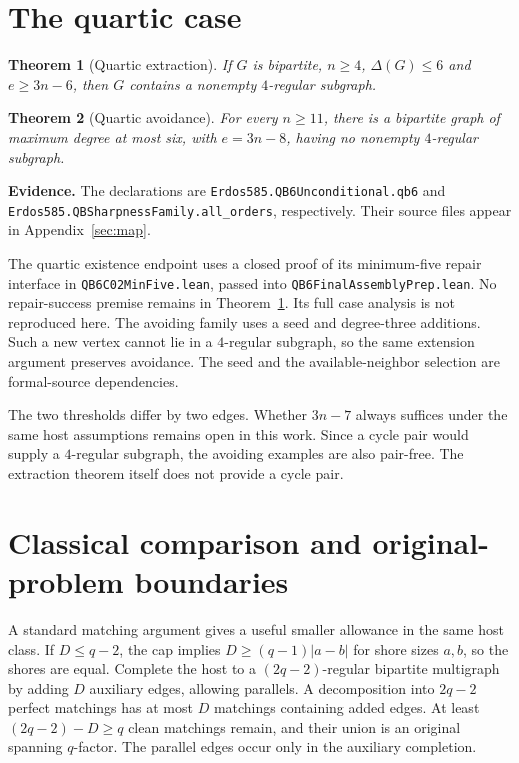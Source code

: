 \documentclass[11pt]{article}
\newtheorem{theorem}{Theorem}
\newcommand{\status}[1]{\par\noindent\textcolor{blue!45!black}{\textbf{Evidence.} #1}\par}
\begin{document}
\section{The quartic case}
\begin{theorem}[Quartic extraction]\label{thm:quartic}
If $G$ is bipartite, $n\ge4$, $\Delta(G)\le6$ and $e\ge3n-6$, then $G$ contains a nonempty $4$-regular subgraph.
\end{theorem}
\begin{theorem}[Quartic avoidance]\label{thm:quarticavoid}
For every $n\ge11$, there is a bipartite graph of maximum degree at most six, with $e=3n-8$, having no nonempty $4$-regular subgraph.
\end{theorem}
\status{The declarations are \nolinkurl{Erdos585.QB6Unconditional.qb6} and \nolinkurl{Erdos585.QBSharpnessFamily.all_orders}, respectively. Their source files appear in Appendix~\ref{sec:map}.}
The quartic existence endpoint uses a closed proof of its minimum-five repair interface in \nolinkurl{QB6C02MinFive.lean}, passed into \nolinkurl{QB6FinalAssemblyPrep.lean}. No repair-success premise remains in Theorem~\ref{thm:quartic}. Its full case analysis is not reproduced here. The avoiding family uses a seed and degree-three additions. Such a new vertex cannot lie in a $4$-regular subgraph, so the same extension argument preserves avoidance. The seed and the available-neighbor selection are formal-source dependencies.

The two thresholds differ by two edges. Whether $3n-7$ always suffices under the same host assumptions remains open in this work. Since a cycle pair would supply a $4$-regular subgraph, the avoiding examples are also pair-free. The extraction theorem itself does not provide a cycle pair.

\section{Classical comparison and original-problem boundaries}
A standard matching argument gives a useful smaller allowance in the same host class. If $D\le q-2$, the cap implies $D\ge(q-1)|a-b|$ for shore sizes $a,b$, so the shores are equal. Complete the host to a $(2q-2)$-regular bipartite multigraph by adding $D$ auxiliary edges, allowing parallels. A decomposition into $2q-2$ perfect matchings has at most $D$ matchings containing added edges. At least $(2q-2)-D\ge q$ clean matchings remain, and their union is an original spanning $q$-factor. The parallel edges occur only in the auxiliary completion.
\end{document}
